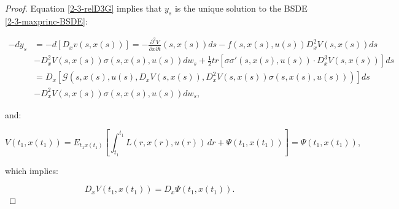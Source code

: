 \begin{theorem}
\begin{proof}
        Equation \ref{2-3-relD3G} implies that $y_s$ is the unique solution to the BSDE \ref{2-3-maxprinc-BSDE}:

        \begin{align*}
            -dy_s & = -d[D_xv(s,x(s))] =  -\frac{\partial^2V}{\partial x\partial t}(s,x(s))ds - f(s,x(s),u(s))D_x^2V(s,x(s))ds \\
            & - D_x^2V(s,x(s))\sigma(s,x(s),u(s))dw_s + \frac{1}{2}tr\left[\sigma\sigma'(s,x(s),u(s))\cdot D_x^3V(s,x(s))\right]ds \\
            & = D_x\left[\mathcal{G}(s,x(s),u(s),D_xV(s,x(s)),D_x^2V(s,x(s))\sigma(s,x(s),u(s)))\right]ds \\
            & - D_x^2V(s,x(s))\sigma(s,x(s),u(s))dw_s,
        \end{align*}

        and:

        \[V(t_1,x(t_1)) = E_{t_1x(t_1)}\left[\int_{t_1}^{t_1} L(r,x(r),u(r))\,dr + \Psi(t_1,x(t_1))\right] = \Psi(t_1,x(t_1)), \]

        which implies:

        \[D_xV(t_1,x(t_1)) = D_x\Psi(t_1,x(t_1)).\]
    \end{proof}
\end{theorem}